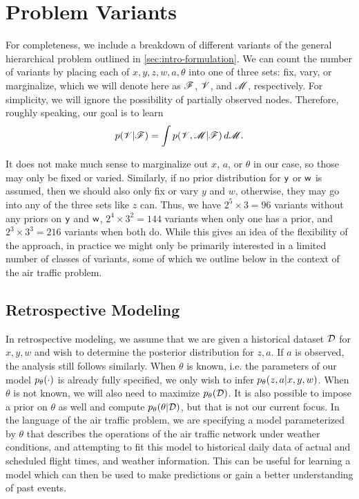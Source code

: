 \section{Problem Variants}
\label{sec:intro-variants}

For completeness, we include a breakdown of different variants of the general hierarchical problem outlined in \cref{sec:intro-formulation}. We can count the number of variants by placing each of $x,y,z,w,a,\theta$ into one of three sets: fix, vary, or marginalize, which we will denote here as $\mathscr{F}$, $\mathscr{V}$, and $\mathscr{M}$, respectively. For simplicity, we will ignore the possibility of partially observed nodes. Therefore, roughly speaking, our goal is to learn 
\begin{equation}
    \pd{\ms V \given \ms F} = \int \pd{\ms V, \ms M\given \ms F} \,d\ms M.
\end{equation}

It does not make much sense to marginalize out $x$, $a$, or $\theta$ in our case, so those may only be fixed or varied. Similarly, if no prior distribution for $\mathsf y$ or $\mathsf w$ is assumed, then we should also only fix or vary $y$ and $w$, otherwise, they may go into any of the three sets like $z$ can. Thus, we have $2^5\times 3=96$ variants without any priors on $\mathsf y$ and $\mathsf w$, $2^4\times 3^2=144$ variants when only one has a prior, and $2^3\times 3^3=216$ variants when both do. While this gives an idea of the flexibility of the approach, in practice we might only be primarily interested in a limited number of classes of variants, some of which we outline below in the context of the air traffic problem.

\subsection{Retrospective Modeling}
\label{subsec:intro-variants-retrospective}

In retrospective modeling, we assume that we are given a historical dataset $\mathcal D$ for $x,y,w$ and wish to determine the posterior distribution for $z,a$. If $a$ is observed, the analysis still follows similarly. When $\theta$ is known, i.e. the parameters of our model $\pld{\cdot}$ is already fully specified, we only wish to infer $\pld{z,a\given x,y,w}$. When $\theta$ is not known, we will also need to maximize $\pld{\Data}$. It is also possible to impose a prior on $\theta$ as well and compute $\pld{\theta\given\Data}$, but that is not our current focus. In the language of the air traffic problem, we are specifying a model parameterized by $\theta$ that describes the operations of the air traffic network under weather conditions, and attempting to fit this model to historical daily data of actual and scheduled flight times, and weather information. This can be useful for learning a model which can then be used to make predictions or gain a better understanding of past events.

